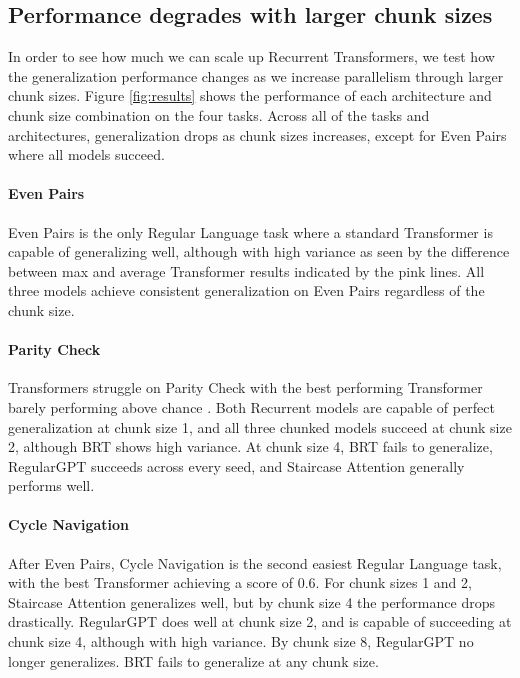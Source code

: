     \subsection{Performance degrades with larger chunk sizes}
    In order to see how much we can scale up Recurrent Transformers, we test how the generalization performance changes as we increase parallelism through larger chunk sizes. Figure \ref{fig:results} shows the performance of each architecture and chunk size combination on the four tasks. Across all of the tasks and architectures, generalization drops as chunk sizes increases, except for Even Pairs where all models succeed.
    
    \paragraph{Even Pairs} Even Pairs is the only Regular Language task where a standard Transformer is capable of generalizing well, although with high variance as seen by the difference between max and average Transformer results indicated by the pink lines. All three models achieve consistent generalization on Even Pairs regardless of the chunk size. 
    
    \paragraph{Parity Check} Transformers struggle on Parity Check with the best performing Transformer barely performing above chance \citep{hahn_theoretical_2020, 10.1162/tacl_a_00490, chiang-cholak-2022-overcoming}. Both Recurrent models are capable of perfect generalization at chunk size 1, and all three chunked models succeed at chunk size 2, although BRT shows high variance. At chunk size 4, BRT fails to generalize, RegularGPT succeeds across every seed, and Staircase Attention generally performs well. 
    
    \paragraph{Cycle Navigation} After Even Pairs, Cycle Navigation is the second easiest Regular Language task, with the best Transformer achieving a score of 0.6. For chunk sizes 1 and 2, Staircase Attention generalizes well, but by chunk size 4 the performance drops drastically. RegularGPT does well at chunk size 2, and is capable of succeeding at chunk size 4, although with high variance. By chunk size 8, RegularGPT no longer generalizes. BRT fails to generalize at any chunk size.
    
